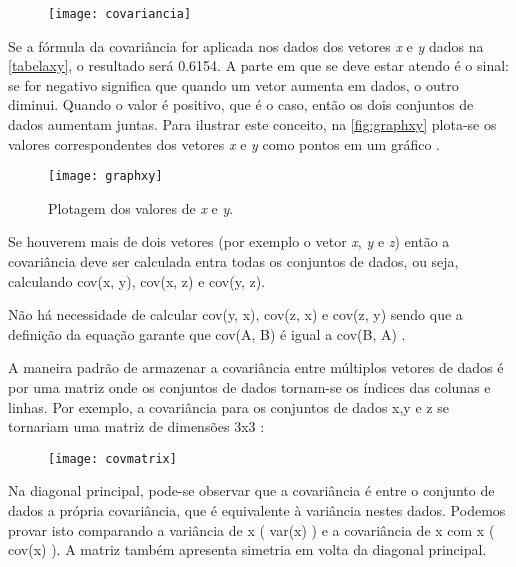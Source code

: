 \begin{figure}[h]
	\centering
	\texttt{[image: covariancia]}
	\label{fig:variancia}
\end{figure}

Se a fórmula da covariância for aplicada nos dados dos vetores \textit{x} e \textit{y} dados na \autoref{tabelaxy}, o resultado será 0.6154. A parte em que se deve estar atendo é o sinal: se for negativo significa que quando um vetor aumenta em dados, o outro diminui. Quando o valor é positivo, que é o caso, então os dois conjuntos de dados aumentam juntas. Para ilustrar este conceito, na \autoref{fig:graphxy} plota-se os valores correspondentes dos vetores \textit{x} e \textit{y} como pontos em um gráfico \cite{drmathew_java_programming}.


\begin{figure}[h]
	\centering
	\texttt{[image: graphxy]}
	\caption{Plotagem dos valores de \textit{x} e \textit{y}.}
	\label{fig:graphxy}
\end{figure}

Se houverem mais de dois vetores (por exemplo o vetor \textit{x}, \textit{y} e \textit{z}) então a covariância deve ser calculada entra todas os conjuntos de dados, ou seja, calculando cov(x, y), cov(x, z) e cov(y, z). 

Não há necessidade de calcular cov(y, x), cov(z, x) e cov(z, y) sendo que a definição da equação garante que cov(A, B) é igual a cov(B, A) .

A maneira padrão de armazenar a covariância entre múltiplos vetores de dados é por uma matriz onde os conjuntos de dados tornam-se os índices das colunas e linhas. Por exemplo, a covariância para os conjuntos de dados x,y e z se tornariam uma matriz de dimensões 3x3 \cite{drmathew_java_programming}:

\begin{figure}[h]
	\centering
	\texttt{[image: covmatrix]}
	\label{fig:covmatrix}
\end{figure}

Na diagonal principal, pode-se observar que a covariância é entre o conjunto de dados a própria covariância, que é equivalente à variância nestes dados. Podemos provar isto comparando a variância de x ( var(x) ) e a covariância de x com x ( cov(x) ). A matriz também apresenta simetria em volta da diagonal principal. 

